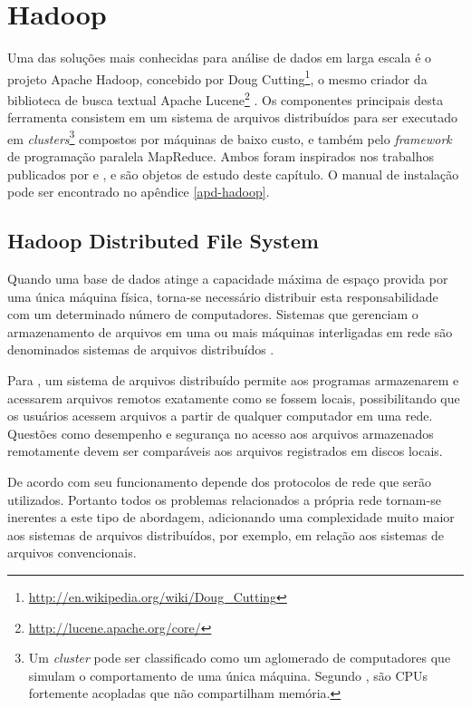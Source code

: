 \chapter{Hadoop}
\label{cap:hadoop}

Uma das soluções mais conhecidas para análise de dados em larga escala é o projeto Apache Hadoop, concebido por Doug Cutting\footnote{\url{http://en.wikipedia.org/wiki/Doug_Cutting}}, o mesmo criador da biblioteca de busca textual Apache Lucene\footnote{\url{http://lucene.apache.org/core/}} \cite{white2012}. Os componentes principais desta ferramenta consistem em um sistema de arquivos distribuídos para ser executado em \textit{clusters}\footnote{Um \textit{cluster} pode ser classificado como um aglomerado de computadores que simulam o comportamento de uma única máquina. Segundo , são CPUs fortemente acopladas que não compartilham memória.} compostos por máquinas de baixo custo, e também pelo \textit{framework} de programação paralela MapReduce. Ambos foram inspirados nos trabalhos publicados por  e , e são objetos de estudo deste capítulo. O manual de instalação pode ser encontrado no apêndice \ref{apd-hadoop}.

\section{Hadoop Distributed File System}

Quando uma base de dados atinge a capacidade máxima de espaço provida por uma única máquina física, torna-se necessário distribuir esta responsabilidade com um determinado número de computadores. Sistemas que gerenciam o armazenamento de arquivos em uma ou mais máquinas interligadas em rede são denominados sistemas de arquivos distribuídos \cite{white2012}. 

Para , um sistema de arquivos distribuído permite aos programas armazenarem e acessarem arquivos remotos exatamente como se fossem locais, possibilitando que os usuários acessem arquivos a partir de qualquer computador em uma rede. Questões como desempenho e segurança no acesso aos arquivos armazenados remotamente devem ser comparáveis aos arquivos registrados em discos locais.

De acordo com  seu funcionamento depende dos protocolos de rede que serão utilizados. Portanto todos os problemas relacionados a própria rede tornam-se inerentes a este tipo de abordagem, adicionando uma complexidade muito maior aos sistemas de arquivos distribuídos, por exemplo, em relação aos sistemas de arquivos convencionais.

